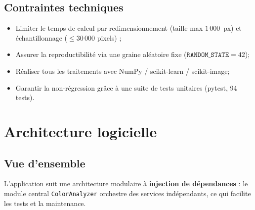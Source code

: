 \documentclass[11pt,a4paper]{article}
\begin{document}
\subsection{Contraintes techniques}

\begin{itemize}
  \item Limiter le temps de calcul par redimensionnement (taille max
        $1\,000$~px) et échantillonnage ($\leq 30\,000$ pixels) ;
  \item Assurer la reproductibilité via une graine aléatoire fixe
        ($\texttt{RANDOM\_STATE} = 42$);
  \item Réaliser tous les traitements avec NumPy / scikit-learn /
        scikit-image;
  \item Garantir la non-régression grâce à une suite de tests unitaires
        (pytest, 94 tests).
\end{itemize}

\section{Architecture logicielle}

\subsection{Vue d'ensemble}

L'application suit une architecture modulaire à \textbf{injection de
dépendances} : le module central \texttt{ColorAnalyzer} orchestre des
services indépendants, ce qui facilite les tests et la maintenance.
\end{document}
